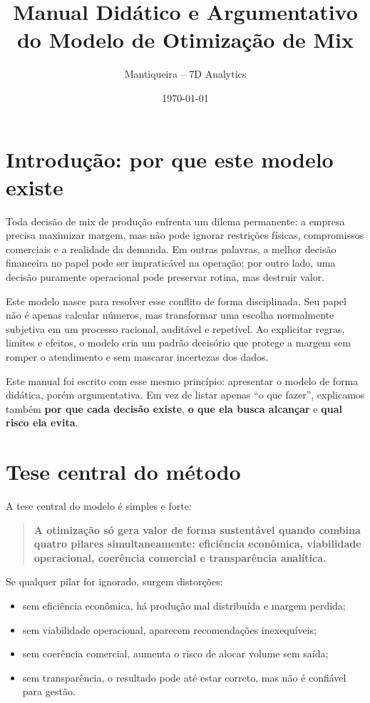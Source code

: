 \documentclass[11pt,a4paper]{article}
\title{Manual Didático e Argumentativo\\do Modelo de Otimização de Mix}
\author{Mantiqueira -- 7D Analytics}
\date{\today}
\begin{document}
\maketitle
\tableofcontents
\newpage

\section{Introdução: por que este modelo existe}

Toda decisão de mix de produção enfrenta um dilema permanente: a empresa precisa
maximizar margem, mas não pode ignorar restrições físicas, compromissos
comerciais e a realidade da demanda. Em outras palavras, a melhor decisão
financeira no papel pode ser impraticável na operação; por outro lado, uma
decisão puramente operacional pode preservar rotina, mas destruir valor.

Este modelo nasce para resolver esse conflito de forma disciplinada. Seu papel
não é apenas calcular números, mas transformar uma escolha normalmente subjetiva
em um processo racional, auditável e repetível. Ao explicitar regras, limites e
efeitos, o modelo cria um padrão decisório que protege a margem sem romper o
atendimento e sem mascarar incertezas dos dados.

Este manual foi escrito com esse mesmo princípio: apresentar o modelo de forma
didática, porém argumentativa. Em vez de listar apenas ``o que fazer'',
explicamos também \textbf{por que cada decisão existe}, \textbf{o que ela busca
alcançar} e \textbf{qual risco ela evita}.

\section{Tese central do método}

A tese central do modelo é simples e forte:
\begin{quote}
\textbf{A otimização só gera valor de forma sustentável quando combina quatro
pilares simultaneamente: eficiência econômica, viabilidade operacional,
coerência comercial e transparência analítica.}
\end{quote}

Se qualquer pilar for ignorado, surgem distorções:
\begin{itemize}[leftmargin=1.2cm]
    \item sem eficiência econômica, há produção mal distribuída e margem perdida;
    \item sem viabilidade operacional, aparecem recomendações inexequíveis;
    \item sem coerência comercial, aumenta o risco de alocar volume sem saída;
    \item sem transparência, o resultado pode até estar correto, mas não é confiável para gestão.
\end{itemize}
\end{document}

